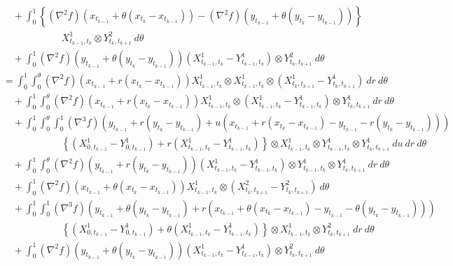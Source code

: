 \begin{prf}
\begin{description}
\begin{align}
						&\quad + \int_0^1 \left\{ (\nabla^2 f) (x_{t_{k-1}}+\theta(x_{t_k}-x_{t_{k-1}})) - (\nabla^2 f)(y_{t_{k-1}}+\theta(y_{t_k}-y_{t_{k-1}})) \right\} \\
						&\qquad\qquad\qquad X^1_{t_{k-1},t_k} \otimes Y^2_{t_k,t_{k+1}}\ d\theta \\
						&\quad + \int_0^1 (\nabla^2 f)(y_{t_{k-1}}+\theta(y_{t_k}-y_{t_{k-1}})) \left( X^1_{t_{k-1},t_k} - Y^1_{t_{k-1},t_k} \right) \otimes Y^2_{t_k,t_{k+1}}\ d\theta \\
					&= \int_0^1 \int_0^\theta (\nabla^2 f)(x_{t_{k-1}}+r(x_{t_k}-x_{t_{k-1}})) X^1_{t_{k-1},t_k} \otimes X^1_{t_{k-1},t_k} \otimes \left(X^1_{t_k,t_{k+1}} - Y^1_{t_k,t_{k+1}}\right)\ dr\ d\theta \\
						&\quad + \int_0^1 \int_0^\theta (\nabla^2 f)(x_{t_{k-1}}+r(x_{t_k}-x_{t_{k-1}})) X^1_{t_{k-1},t_k} \otimes \left(X^1_{t_{k-1},t_k} - Y^1_{t_{k-1},t_k} \right) \otimes Y^1_{t_k,t_{k+1}}\ dr\ d\theta \\
						&\quad +  \int_0^1 \int_0^\theta \int_0^1 (\nabla^3 f)(y_{t_{k-1}}+r(y_{t_k}-y_{t_{k-1}}) + u(x_{t_{k-1}}+r(x_{t_k}-x_{t_{k-1}}) - y_{t_{k-1}}-r(y_{t_k}-y_{t_{k-1}}))) \\
						&\qquad\qquad\qquad \left\{ \left( X^1_{0,t_{k-1}} - Y^1_{0,t_{k-1}} \right) + r\left( X^1_{t_{k-1},t_k} - Y^1_{t_{k-1},t_k} \right) \right\} \otimes X^1_{t_{k-1},t_k} \otimes Y^1_{t_{k-1},t_k} \otimes Y^1_{t_k,t_{k+1}}\ du\ dr\ d\theta \\
						&\quad + \int_0^1 \int_0^\theta (\nabla^2 f)(y_{t_{k-1}}+r(y_{t_k}-y_{t_{k-1}})) \left( X^1_{t_{k-1},t_k} - Y^1_{t_{k-1},t_k} \right) \otimes Y^1_{t_{k-1},t_k} \otimes Y^1_{t_k,t_{k+1}}\ dr\ d\theta \\
						&\quad + \int_0^1 (\nabla^2 f)(x_{t_{k-1}}+\theta(x_{t_k}-x_{t_{k-1}}))X^1_{t_{k-1},t_k} \otimes \left(X^2_{t_k,t_{k+1}} -  Y^2_{t_k,t_{k+1}}\right)\ d\theta \\
						&\quad + \int_0^1 \int_0^1 (\nabla^3 f) (y_{t_{k-1}}+\theta(y_{t_k}-y_{t_{k-1}}) + r(x_{t_{k-1}}+\theta(x_{t_k}-x_{t_{k-1}})-y_{t_{k-1}}-\theta(y_{t_k}-y_{t_{k-1}}))) \\
						&\qquad\qquad\qquad \left\{ \left( X^1_{0,t_{k-1}} - Y^1_{0,t_{k-1}} \right) + \theta\left( X^1_{t_{k-1},t_k} - Y^1_{t_{k-1},t_k} \right) \right\} \otimes X^1_{t_{k-1},t_k} \otimes Y^2_{t_k,t_{k+1}}\ dr\ d\theta \\
						&\quad + \int_0^1 (\nabla^2 f)(y_{t_{k-1}}+\theta(y_{t_k}-y_{t_{k-1}})) \left( X^1_{t_{k-1},t_k} - Y^1_{t_{k-1},t_k} \right) \otimes Y^2_{t_k,t_{k+1}}\ d\theta

\end{align}
\end{description}
\end{prf}
